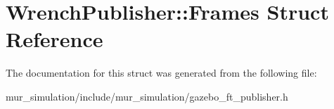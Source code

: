 \hypertarget{structWrenchPublisher_1_1Frames}{}\section{Wrench\+Publisher\+:\+:Frames Struct Reference}
\label{structWrenchPublisher_1_1Frames}


The documentation for this struct was generated from the following file\+:\begin{DoxyCompactItemize}
\item 
mur\+\_\+simulation/include/mur\+\_\+simulation/gazebo\+\_\+ft\+\_\+publisher.\+h\end{DoxyCompactItemize}
